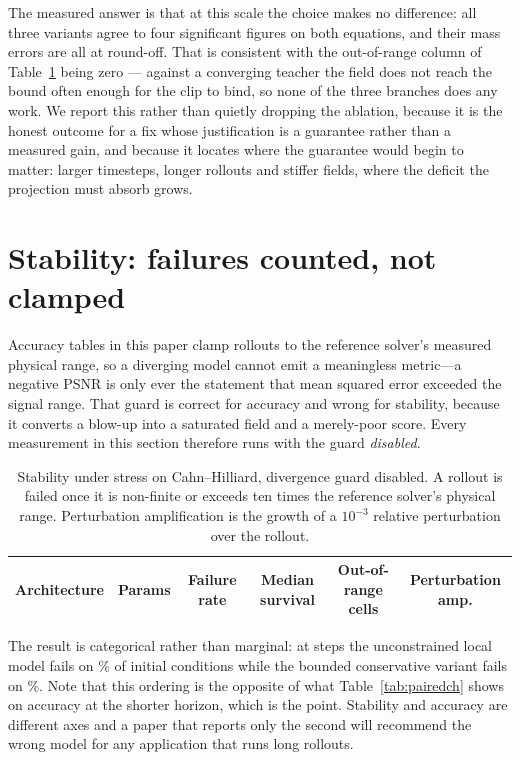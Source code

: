 \documentclass{article}
\begin{document}
The measured answer is that at this scale the choice makes no difference: all three variants
agree to four significant figures on both equations, and their mass errors are all at
round-off. That is consistent with the out-of-range column of Table~\ref{tab:stability}
being zero --- against a converging teacher the field does not reach the bound often enough
for the clip to bind, so none of the three branches does any work. We report this rather
than quietly dropping the ablation, because it is the honest outcome for a fix whose
justification is a guarantee rather than a measured gain, and because it locates where the
guarantee would begin to matter: larger timesteps, longer rollouts and stiffer fields, where
the deficit the projection must absorb grows.

\section{Stability: failures counted, not clamped}
\label{sec:stability}

Accuracy tables in this paper clamp rollouts to the reference solver's measured physical
range, so a diverging model cannot emit a meaningless metric---a negative PSNR is only
ever the statement that mean squared error exceeded the signal range. That guard is
correct for accuracy and wrong for stability, because it converts a blow-up into a
saturated field and a merely-poor score. Every measurement in this section therefore runs
with the guard \emph{disabled}.

\begin{table}[h]
\centering
\caption{Stability under stress on Cahn--Hilliard, divergence guard disabled. A rollout is
failed once it is non-finite or exceeds ten times the reference solver's physical range.
Perturbation amplification is the growth of a $10^{-3}$ relative perturbation over the
rollout.}
\label{tab:stability}
\small
\begin{tabular}{lrcccc}
\toprule
Architecture & Params & Failure rate & Median survival & Out-of-range cells
  & Perturbation amp. \\
\midrule

\bottomrule
\end{tabular}
\end{table}

The result is categorical rather than marginal: at \stabHorizon{} steps the unconstrained
local model fails on \stabNCAFail\% of initial conditions while the bounded conservative
variant fails on \stabBoundedFail\%. Note that this ordering is the opposite of what
Table~\ref{tab:pairedch} shows on accuracy at the shorter horizon, which is the point.
Stability and accuracy are different axes and a paper that reports only the second will
recommend the wrong model for any application that runs long rollouts.
\end{document}
